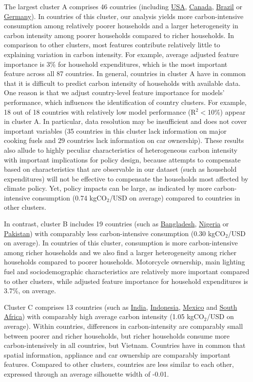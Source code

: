 \documentclass[12pt, a4paper]{article}
\begin{document}
The largest cluster A comprises 46 countries (including \hyperref[fig:5b_USA]{USA}, \hyperref[fig:5b_CAN]{Canada}, \hyperref[fig:5b_BRA]{Brazil} or \hyperref[fig:5b_DEU]{Germany}). In countries of this cluster, our analysis yields more carbon-intensive consumption among relatively poorer households and a larger heterogeneity in carbon intensity among poorer households compared to richer households. In comparison to other clusters, most features contribute relatively little to explaining variation in carbon intensity. For example, average adjusted feature importance is 3\% for household expenditures, which is the most important feature across all 87 countries. In general, countries in cluster A have in common that it is difficult to predict carbon intensity of households with available data. One reason is that we adjust country-level feature importance for models' performance, which influences the identification of country clusters. For example, 18 out of 18 countries with relatively low model performance (R$^{2}<$10\%) appear in cluster A. In particular, data resolution may be insufficient and does not cover important variables (35 countries in this cluster lack information on major cooking fuels and 29 countries lack information on car ownership). These results also allude to highly peculiar characteristics of heterogeneous carbon intensity with important implications for policy design, because attempts to compensate based on characteristics that are observable in our dataset (such as household expenditures) will not be effective to compensate the households most affected by climate policy. Yet, policy impacts can be large, as indicated by more carbon-intensive consumption (0.74 kgCO$_{2}$/USD on average) compared to countries in other clusters. 

In contrast, cluster B includes 19 countries (such as \hyperref[fig:5b_BGD]{Bangladesh}, \hyperref[fig:5b_NGA]{Nigeria} or \hyperref[fig:5b_PAK]{Pakistan}) with comparably less carbon-intensive consumption (0.30 kgCO$_{2}$/USD on average). In countries of this cluster, consumption is more carbon-intensive among richer households and we also find a larger heterogeneity among richer households compared to poorer households. Motorcycle ownership, main lighting fuel and sociodemographic characteristics are relatively more important compared to other clusters, while adjusted feature importance for household expenditures is 3.7\%, on average.

Cluster C comprises 13 countries (such as \hyperref[fig:5b_IND]{India}, \hyperref[fig:5b_IDN]{Indonesia}, \hyperref[fig:5b_MEX]{Mexico} and \hyperref[fig:5b_ZAF]{South Africa}) with comparably high average carbon intensity (1.05 kgCO$_{2}$/USD on average). Within countries, differences in carbon-intensity are comparably small between poorer and richer households, but richer households consume more carbon-intensively in all countries, but Vietnam. Countries have in common that spatial information, appliance and car ownership are comparably important features. Compared to other clusters, countries are less similar to each other, expressed through an average silhouette width of -0.01. 
\end{document}
